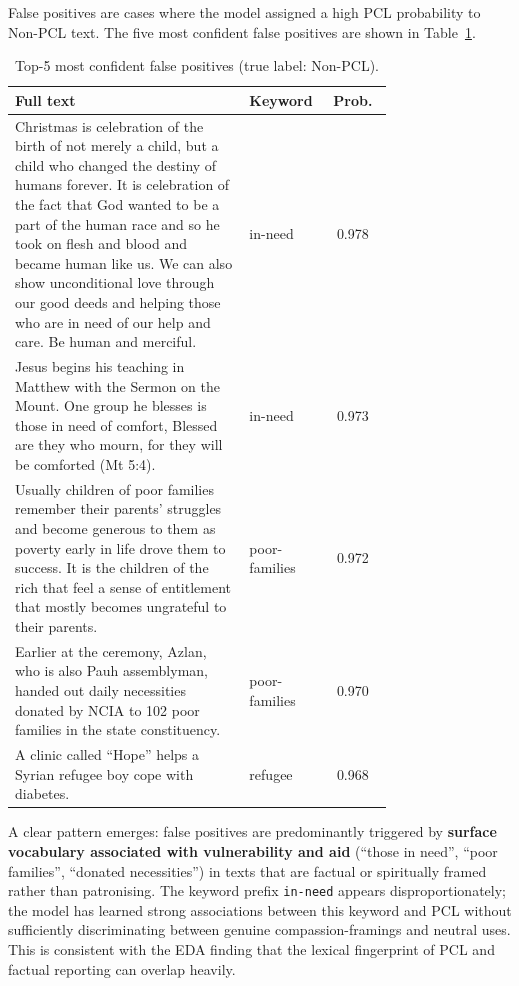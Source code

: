 \documentclass[11pt,a4paper]{article}
\begin{document}
False positives are cases where the model assigned a high PCL probability to Non-PCL text. The five most confident false positives are shown in Table~\ref{tab:fp}.

\begin{table}[H]
    \centering\small
    \begin{tabular}{p{0.62\linewidth}p{0.13\linewidth}c}
        \toprule
        \textbf{Full text} & \textbf{Keyword} & \textbf{Prob.} \\
        \midrule
        Christmas is celebration of the birth of not merely a child, but a child who changed the destiny of humans forever. It is celebration of the fact that God wanted to be a part of the human race and so he took on flesh and blood and became human like us. We can also show unconditional love through our good deeds and helping those who are in need of our help and care. Be human and merciful.
                           & in-need          & 0.978          \\
        \addlinespace
        Jesus begins his teaching in Matthew with the Sermon on the Mount. One group he blesses is those in need of comfort, Blessed are they who mourn, for they will be comforted (Mt 5:4).
                           & in-need          & 0.973          \\
        \addlinespace
        Usually children of poor families remember their parents' struggles and become generous to them as poverty early in life drove them to success. It is the children of the rich that feel a sense of entitlement that mostly becomes ungrateful to their parents.
                           & poor-families    & 0.972          \\
        \addlinespace
        Earlier at the ceremony, Azlan, who is also Pauh assemblyman, handed out daily necessities donated by NCIA to 102 poor families in the state constituency.
                           & poor-families    & 0.970          \\
        \addlinespace
        A clinic called ``Hope'' helps a Syrian refugee boy cope with diabetes.
                           & refugee          & 0.968          \\
        \bottomrule
    \end{tabular}
    \caption{Top-5 most confident false positives (true label: Non-PCL).}
    \label{tab:fp}
\end{table}

A clear pattern emerges: false positives are predominantly triggered by \textbf{surface vocabulary associated with vulnerability and aid} (``those in need'', ``poor families'', ``donated necessities'') in texts that are factual or spiritually framed rather than patronising. The keyword prefix \texttt{in-need} appears disproportionately; the model has learned strong associations between this keyword and PCL without sufficiently discriminating between genuine compassion-framings and neutral uses. This is consistent with the EDA finding that the lexical fingerprint of PCL and factual reporting can overlap heavily.
\end{document}
